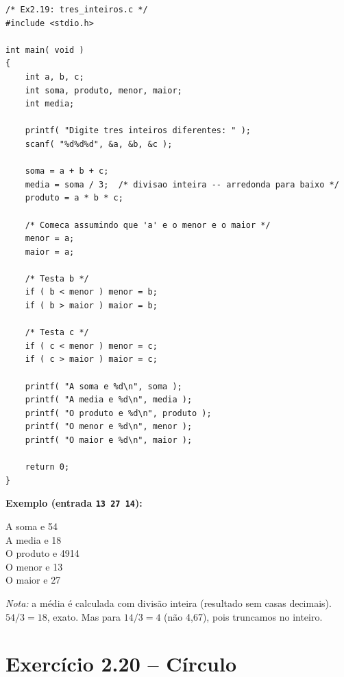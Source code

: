 \documentclass[12pt,a4paper]{article}
\begin{document}
\begin{respostabox}
\begin{lstlisting}
/* Ex2.19: tres_inteiros.c */
#include <stdio.h>

int main( void )
{
    int a, b, c;
    int soma, produto, menor, maior;
    int media;

    printf( "Digite tres inteiros diferentes: " );
    scanf( "%d%d%d", &a, &b, &c );

    soma = a + b + c;
    media = soma / 3;  /* divisao inteira -- arredonda para baixo */
    produto = a * b * c;

    /* Comeca assumindo que 'a' e o menor e o maior */
    menor = a;
    maior = a;

    /* Testa b */
    if ( b < menor ) menor = b;
    if ( b > maior ) maior = b;

    /* Testa c */
    if ( c < menor ) menor = c;
    if ( c > maior ) maior = c;

    printf( "A soma e %d\n", soma );
    printf( "A media e %d\n", media );
    printf( "O produto e %d\n", produto );
    printf( "O menor e %d\n", menor );
    printf( "O maior e %d\n", maior );

    return 0;
}
\end{lstlisting}

\textbf{Exemplo (entrada \texttt{13 27 14}):}
\begin{saida}
A soma e 54\\
A media e 18\\
O produto e 4914\\
O menor e 13\\
O maior e 27
\end{saida}

\textit{Nota:} a média é calculada com divisão inteira (resultado sem casas
decimais). $54 / 3 = 18$, exato. Mas para $14 / 3 = 4$ (não 4,67), pois truncamos
no inteiro.
\end{respostabox}

\section{Exercício 2.20 -- Círculo}
\end{document}

